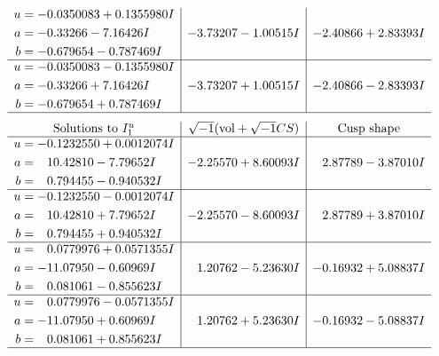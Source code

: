 \documentclass[1p]{elsarticle_modified}
\theoremstyle{definition}
\newcommand{\I}{\sqrt{-1}}
\begin{document}
$$\begin{array}{c|c|c}
\begin{aligned}
u &= -0.0350083 + 0.1355980 I \\
a &= -0.33266 - 7.16426 I \\
b &= -0.679654 - 0.787469 I\end{aligned}
 & -3.73207 - 1.00515 I & -2.40866 + 2.83393 I \\ \hline\begin{aligned}
u &= -0.0350083 - 0.1355980 I \\
a &= -0.33266 + 7.16426 I \\
b &= -0.679654 + 0.787469 I\end{aligned}
 & -3.73207 + 1.00515 I & -2.40866 - 2.83393 I\\
 \hline 
 \end{array}$$\newpage$$\begin{array}{c|c|c}  
\text{Solutions to }I^u_{1}& \I (\text{vol} + \sqrt{-1}CS) & \text{Cusp shape}\\
 \hline 
\begin{aligned}
u &= -0.1232550 + 0.0012074 I \\
a &= \phantom{-}10.42810 - 7.79652 I \\
b &= \phantom{-}0.794455 - 0.940532 I\end{aligned}
 & -2.25570 + 8.60093 I & \phantom{-}2.87789 - 3.87010 I \\ \hline\begin{aligned}
u &= -0.1232550 - 0.0012074 I \\
a &= \phantom{-}10.42810 + 7.79652 I \\
b &= \phantom{-}0.794455 + 0.940532 I\end{aligned}
 & -2.25570 - 8.60093 I & \phantom{-}2.87789 + 3.87010 I \\ \hline\begin{aligned}
u &= \phantom{-}0.0779976 + 0.0571355 I \\
a &= -11.07950 - 0.60969 I \\
b &= \phantom{-}0.081061 - 0.855623 I\end{aligned}
 & \phantom{-}1.20762 - 5.23630 I & -0.16932 + 5.08837 I \\ \hline\begin{aligned}
u &= \phantom{-}0.0779976 - 0.0571355 I \\
a &= -11.07950 + 0.60969 I \\
b &= \phantom{-}0.081061 + 0.855623 I\end{aligned}
 & \phantom{-}1.20762 + 5.23630 I & -0.16932 - 5.08837 I\\
 \hline 
 \end{array}$$\newpage\newpage\renewcommand{\arraystretch}{1}
\end{document}
